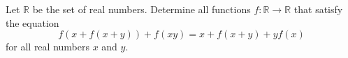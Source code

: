 Let $\mathbb R$ be the set of real numbers. Determine all functions $f:\mathbb R\to\mathbb R$ that satisfy the equation\[f(x+f(x+y))+f(xy)=x+f(x+y)+yf(x)\]for all real numbers $x$ and $y$.